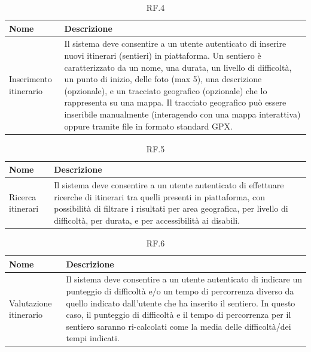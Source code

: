\documentclass{natourDoc}
\begin{document}
\begin{table}[H]
	\centering
	\begin{tabular}{ |p{5cm}|p{10.3cm}| }
		\hline
		\rowcolor{PineGreen!70}
		\textbf{Nome}          & \textbf{Descrizione}                                                                                                    \\
		\hline
		Inserimento itinerario & Il sistema deve consentire a un utente autenticato di inserire nuovi itinerari (sentieri) in piattaforma. Un sentiero è
		caratterizzato da un nome, una durata, un livello di difficoltà, un punto di inizio, delle foto (max 5), una descrizione
		(opzionale), e un tracciato geografico (opzionale) che lo rappresenta su una mappa. Il tracciato
		geografico può essere inseribile manualmente (interagendo con una mappa interattiva) oppure
		tramite file in formato standard GPX.                                                                                                            \\
		\hline
	\end{tabular}
	\caption{RF.4}
	\label{table:4}
\end{table}

\begin{table}[H]
	\centering
	\begin{tabular}{ |p{5cm}|p{10.3cm}| }
		\hline
		\rowcolor{PineGreen!70}
		\textbf{Nome}     & \textbf{Descrizione}                                                                                                                                               \\
		\hline
		Ricerca itinerari & Il sistema deve consentire a un utente autenticato di effettuare ricerche di itinerari tra quelli presenti in piattaforma, con possibilità di filtrare i risultati
		per area geografica, per livello di difficoltà, per durata, e per accessibilità ai disabili.                                                                                           \\
		\hline
	\end{tabular}
	\caption{RF.5}
	\label{table:5}
\end{table}

\begin{table}[H]
	\centering
	\begin{tabular}{ |p{5cm}|p{10.3cm}| }
		\hline
		\rowcolor{PineGreen!70}
		\textbf{Nome}          & \textbf{Descrizione}                                                                                   \\
		\hline
		Valutazione itinerario & Il sistema deve consentire a un utente autenticato di indicare un punteggio di difficoltà e/o un tempo
		di percorrenza diverso da quello indicato dall’utente che ha inserito il sentiero. In questo caso, il
		punteggio di difficoltà e il tempo di percorrenza per il sentiero saranno ri-calcolati come la media
		delle difficoltà/dei tempi indicati.                                                                                            \\
		\hline
	\end{tabular}
	\caption{RF.6}
	\label{table:6}
\end{table}
\end{document}
